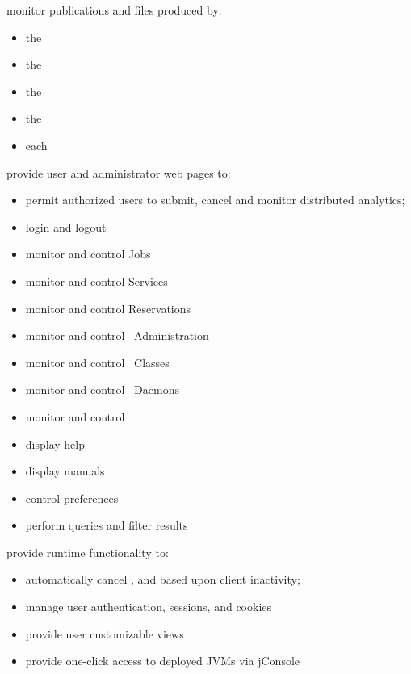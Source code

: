     \begin{description}
      \item monitor publications and files produced by:
      \begin{itemize}
        \item the \varOR
        \item the \varRM
        \item the \varSM
        \item the \varPM
        \item each \varAgent
      \end{itemize}
      \item provide user and administrator web pages to:
      \begin{itemize}
        \item permit authorized users to submit, cancel and monitor distributed analytics;
        \item login and logout
        \item monitor and control Jobs
        \item monitor and control Services
        \item monitor and control Reservations
        \item monitor and control \varDUCC~Administration
        \item monitor and control \varDUCC~Classes
        \item monitor and control \varDUCC~Daemons
        \item monitor and control \varDUCC~\varNodesMachinesComputers
        \item display help
        \item display manuals
        \item control preferences
        \item perform queries and filter results
      \end{itemize}
    \item provide runtime functionality to:
      \begin{itemize}
      \item automatically cancel \varJobs, \varReservations and \varServices based upon client inactivity;
      \item manage user authentication, sessions, and cookies
      \item provide user customizable views
      \item provide one-click access to deployed JVMs via jConsole
      \end{itemize}
    \end{description}
           
